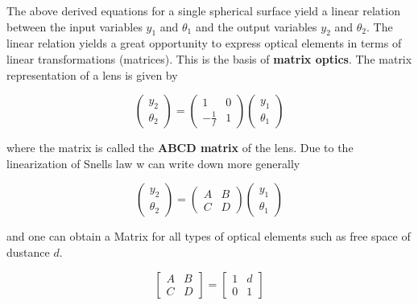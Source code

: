 \documentclass[
  a4paper,
]{book}
\begin{document}
\newpage

\begin{tcolorbox}[enhanced jigsaw, breakable, toptitle=1mm, bottomrule=.15mm, colbacktitle=quarto-callout-note-color!10!white, title=\textcolor{quarto-callout-note-color}{\faInfo}\hspace{0.5em}{Matrix Optics}, arc=.35mm, rightrule=.15mm, bottomtitle=1mm, opacityback=0, toprule=.15mm, coltitle=black, leftrule=.75mm, opacitybacktitle=0.6, colback=white, left=2mm, titlerule=0mm, colframe=quarto-callout-note-color-frame]

The above derived equations for a single spherical surface yield a
linear relation between the input variables \(y_1\) and \(\theta_1\) and
the output variables \(y_2\) and \(\theta_2\). The linear relation
yields a great opportunity to express optical elements in terms of
linear transformations (matrices). This is the basis of \textbf{matrix
optics}. The matrix representation of a lens is given by

\[\begin{pmatrix} y_2 \\ \theta_2 \end{pmatrix} = \begin{pmatrix} 1 & 0 \\ -\frac{1}{f} & 1 \end{pmatrix} \begin{pmatrix} y_1 \\ \theta_1 \end{pmatrix}\]

where the matrix is called the \textbf{ABCD matrix} of the lens. Due to
the linearization of Snells law w can write down more generally

\[\begin{pmatrix} y_2 \\
\theta_2 \end{pmatrix} = \begin{pmatrix} A & B \\ C & D \end{pmatrix} \begin{pmatrix} y_1 \\ \theta_1 \end{pmatrix}\]

and one can obtain a Matrix for all types of optical elements such as
free space of dustance \(d\).

\[\begin{bmatrix}
A & B\\
C & D
\end{bmatrix}
=
\begin{bmatrix}
1 & d\\
0 & 1
\end{bmatrix}
\]


\end{tcolorbox}
\end{document}
